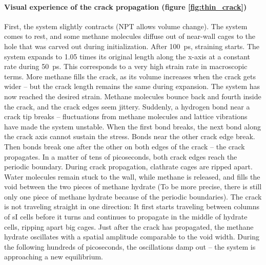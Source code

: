 \begin{framed}
\paragraph{Visual experience of the crack propagation (figure \ref{fig:thin_crack})}
First, the system slightly contracts (NPT allows volume change). The system comes to rest, and some methane molecules diffuse out of near-wall cages to the hole that was carved out during initialization. After \SI{100}{\pico\second}, straining starts. The system expands to 1.05 times its original length along the x-axis at a constant rate during \SI{50}{\pico\second}. This corresponds to a very high strain rate in macroscopic terms. More methane fills the crack, as its volume increases when the crack gets wider -- but the crack length remains the same during expansion. The system has now reached the desired strain. Methane molecules bounce back and fourth inside the crack, and the crack edges seem jittery. Suddenly, a hydrogen bond near a crack tip breaks -- fluctuations from methane molecules and lattice vibrations have made the system unstable. When the first bond breaks, the next bond along the crack axis cannot sustain the stress. Bonds near the other crack edge break. Then bonds break one after the other on both edges of the crack -- the crack propagates. In a matter of tens of picoseconds, both crack edges reach the periodic boundary. During crack propagation, clathrate cages are ripped apart. Water molecules remain stuck to the wall, while methane is released, and fills the void between the two pieces of methane hydrate (To be more precise, there is still only one piece of methane hydrate because of the periodic boundaries). The crack is not traveling straight in one direction: It first starts traveling between columns of sI cells before it turns and continues to propagate in the middle of hydrate cells, ripping apart big cages. Just after the crack has propagated, the methane hydrate oscillates with a spatial amplitude comparable to the void width. During the following hundreds of picoseconds, the oscillations damp out -- the system is approaching a new equilibrium.
\end{framed}

